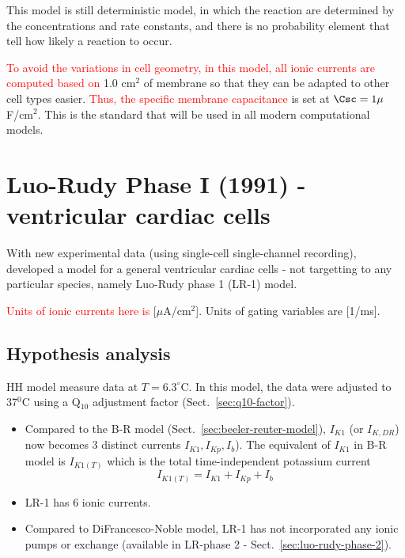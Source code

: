 This model is still deterministic model, in which the reaction are
determined by the concentrations and rate constants, and there is no
probability element that tell how likely a reaction to occur. 

\textcolor{red}{To avoid the variations in cell geometry, in this
  model, all ionic currents are computed based on} 1.0 cm$^2$ of membrane so
  that they can be adapted to other cell types easier. \textcolor{red}{Thus, the
  specific membrane capacitance} is set at $\Csc=1\mu$F/cm$^2$. This is the
  standard that will be used in all modern computational models.

\section{Luo-Rudy Phase I (1991) - ventricular cardiac cells}
\label{sec:luo-rudy-phase-1}

With new experimental data (using single-cell single-channel recording),
~\citep{luo1991mcap} developed a model for a general ventricular cardiac cells -
not targetting to any particular species, namely Luo-Rudy phase 1 (LR-1) model.

\textcolor{red}{Units of ionic currents here is} $[\mu$A/cm$^2$]. Units
of gating variables are [1/ms]. 

\subsection{Hypothesis analysis}
\label{sec:hypothesis-analysis-2}

HH model measure data at $T=6.3^\circ$C. In this model, the data were
adjusted to 37$^0$C using a Q$_{10}$ adjustment factor
(Sect.~\ref{sec:q10-factor}).
\begin{itemize}
\item Compared to the B-R model (Sect.~\ref{sec:beeler-reuter-model}),
  $I_{K1}$ (or $I_{K,DR}$) now becomes 3
  distinct currents $I_{K1},I_{Kp},I_b$). The equivalent of $I_{K1}$ in B-R
  model is $I_{K1(T)}$ which is the total time-independent potassium current
  \begin{equation}
  I_{K1(T)} = I_{K1} + I_{Kp} + I_b
  \end{equation}  

\item  LR-1 has 6 ionic currents. 

\item Compared to DiFrancesco-Noble model, LR-1 has not incorporated
  any ionic pumps or exchange (available in LR-phase 2 -
  Sect.~\ref{sec:luo-rudy-phase-2}).
\end{itemize}

